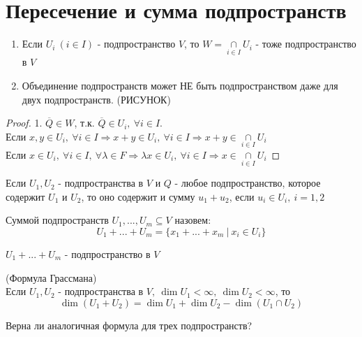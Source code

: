 \section{Пересечение и сумма подпространств}
  \begin{subtheorem}\tab
    \begin{enumerate}
      \item Если $U_i \ (i\in I)$ - подпространство $V$, то $W = \underset{i\in I}{\cap}U_i$ - тоже подпространство в $V$
      \item Объединение подпространств может НЕ быть подпространством даже для двух подпространств.
      (РИСУНОК)
    \end{enumerate}
  \end{subtheorem} 
  \begin{proof}
    1. $\overline{Q} \in W$, т.к. $\overline{Q} \in U_i, \ \forall i\in I$. \vspace{0.2cm}\\
    Если $x,y \in U_i, \ \forall i\in I \Longrightarrow x+y \in U_i, \ \forall i\in I \Longrightarrow x+y \in \underset{i\in I}{\cap}U_i$ \vspace{0.15cm}\\
    Если $x \in U_i, \ \forall i\in I, \ \forall \lambda \in F \Longrightarrow \lambda x \in U_i, \ \forall i\in I \Longrightarrow x \in \underset{i\in I}{\cap}U_i$  
  \end{proof}
  \begin{remark}
    Если $U_1, U_2$ - подпространства в $V$ и $Q$ - любое подпространство, которое содержит $U_1$ и $U_2$, то оно содержит и сумму $u_1+u_2$, если $u_i \in U_i, \ i =1,2$       
  \end{remark}
  \begin{remark}
    Суммой подпространств $U_1,...,U_m \subseteq V$ назовем: $$U_1 + ... + U_m = \{x_1+...+x_m \ | \ x_i \in U_i\}$$   
  \end{remark}
  \begin{subtheorem}
    $U_1 + ... + U_m$ - подпространство в $V$  
  \end{subtheorem}
  \begin{theorem} (Формула Грассмана)\\
    Если $U_1,U_2$ - подпространства в $V, \ \dim U_1 < \infty, \ \dim U_2 < \infty$, то 
    $$\dim (U_1+U_2) = \dim U_1 + \dim U_2 - \dim (U_1 \cap U_2)$$   
  \end{theorem}
  \begin{exercise}
    Верна ли аналогичная формула для трех подпространств? 
  \end{exercise}